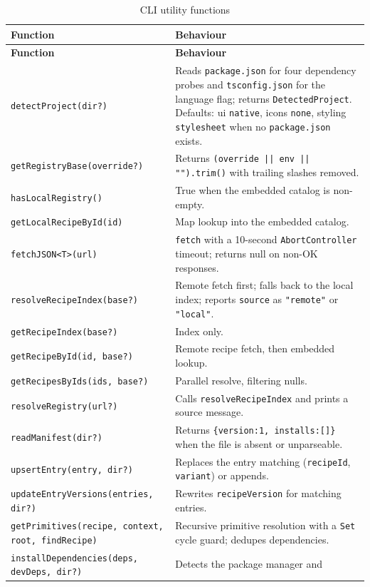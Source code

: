 \begin{longtable}{@{}L{4.2cm}L{9.8cm}@{}}
\caption{CLI utility functions}\\
\toprule
\textbf{Function} & \textbf{Behaviour} \\
\midrule
\endfirsthead
\toprule
\textbf{Function} & \textbf{Behaviour} \\
\midrule
\endhead
\texttt{detectProject(dir?)} & Reads \texttt{package.json} for four dependency
probes and \texttt{tsconfig.json} for the language flag; returns
\texttt{DetectedProject}. Defaults: ui \texttt{native}, icons \texttt{none},
styling \texttt{stylesheet} when no \texttt{package.json} exists. \\
\texttt{getRegistryBase(override?)} & Returns \texttt{(override || env || "").trim()}
with trailing slashes removed. \\
\texttt{hasLocalRegistry()} & True when the embedded catalog is non-empty. \\
\texttt{getLocalRecipeById(id)} & Map lookup into the embedded catalog. \\
\texttt{fetchJSON<T>(url)} & \texttt{fetch} with a 10-second \texttt{AbortController}
timeout; returns null on non-OK responses. \\
\texttt{resolveRecipeIndex(base?)} & Remote fetch first; falls back to the local
index; reports \texttt{source} as \texttt{"remote"} or \texttt{"local"}. \\
\texttt{getRecipeIndex(base?)} & Index only. \\
\texttt{getRecipeById(id, base?)} & Remote recipe fetch, then embedded lookup. \\
\texttt{getRecipesByIds(ids, base?)} & Parallel resolve, filtering nulls. \\
\texttt{resolveRegistry(url?)} & Calls \texttt{resolveRecipeIndex} and prints a
source message. \\
\texttt{readManifest(dir?)} & Returns \texttt{\{version:1, installs:[]\}} when the file
is absent or unparseable. \\
\texttt{upsertEntry(entry, dir?)} & Replaces the entry matching
(\texttt{recipeId}, \texttt{variant}) or appends. \\
\texttt{updateEntryVersions(entries, dir?)} & Rewrites \texttt{recipeVersion} for
matching entries. \\
\texttt{getPrimitives(recipe, context, root, findRecipe)} & Recursive primitive
resolution with a \texttt{Set} cycle guard; dedupes dependencies. \\
\texttt{installDependencies(deps, devDeps, dir?)} & Detects the package manager and

\end{longtable}
